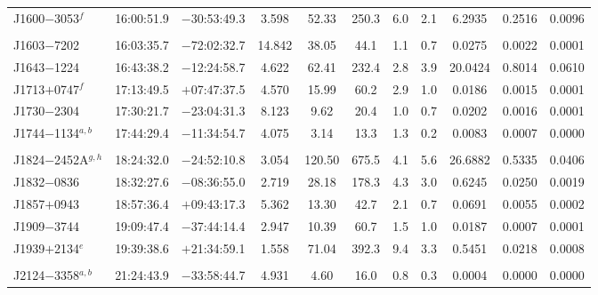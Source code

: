 \documentclass[useAMS,usenatbib]{mn2e}
\begin{document}
\begin{table}
\begin{center}
\begin{tabular}{lcccccccccc}
J1600$-$3053$^{f}$   & 16:00:51.9  &  $-$30:53:49.3 &  3.598  &  52.33    & 250.3    & 6.0       & 2.1    &  6.2935  &  0.2516  &  0.0096  \\ 
                     &             &                &         &           &          &           &        &          &          &          \\ 
J1603$-$7202         & 16:03:35.7  &  $-$72:02:32.7 &  14.842 &  38.05    & 44.1     & 1.1       & 0.7    &  0.0275  &  0.0022  &  0.0001  \\ 
J1643$-$1224         & 16:43:38.2  &  $-$12:24:58.7 &  4.622  &  62.41    & 232.4    & 2.8       & 3.9    &  20.0424 &  0.8014  &  0.0610  \\
J1713$+$0747$^{f}$   & 17:13:49.5  &  $+$07:47:37.5 &  4.570  &  15.99    & 60.2     & 2.9       & 1.0    &  0.0186  &  0.0015  &  0.0001  \\ 
J1730$-$2304         & 17:30:21.7  &  $-$23:04:31.3 &  8.123  &  9.62     & 20.4     & 1.0       & 0.7    &  0.0202  &  0.0016  &  0.0001  \\ 
J1744$-$1134$^{a,b}$ & 17:44:29.4  &  $-$11:34:54.7 &  4.075  &  3.14     & 13.3     & 1.3       & 0.2    &  0.0083  &  0.0007  &  0.0000  \\ 
                     &             &                &         &           &          &           &        &          &          &          \\ 
J1824$-$2452A$^{g,h}$& 18:24:32.0  &  $-$24:52:10.8 &  3.054  &  120.50   & 675.5    & 4.1       & 5.6    & 26.6882  &  0.5335  &  0.0406  \\ 
J1832$-$0836         & 18:32:27.6  &  $-$08:36:55.0 &  2.719  &  28.18    & 178.3    & 4.3       & 3.0    &  0.6245  &  0.0250  &  0.0019  \\ 
J1857$+$0943         & 18:57:36.4  &  $+$09:43:17.3 &  5.362  &  13.30    & 42.7     & 2.1       & 0.7    &  0.0691  &  0.0055  &  0.0002  \\ 
J1909$-$3744         & 19:09:47.4  &  $-$37:44:14.4 &  2.947  &  10.39    & 60.7     & 1.5       & 1.0    &  0.0187  &  0.0007  &  0.0001  \\ 
J1939$+$2134$^{e}$   & 19:39:38.6  &  $+$21:34:59.1 &  1.558  &  71.04    & 392.3    & 9.4       & 3.3    &  0.5451  &  0.0218  &  0.0008  \\ 
                     &             &                &         &           &          &           &        &          &          &          \\ 
J2124$-$3358$^{a,b}$ & 21:24:43.9  &  $-$33:58:44.7 &  4.931  &  4.60     & 16.0     & 0.8       & 0.3    &  0.0004  &  0.0000  &  0.0000  \\ 

\end{tabular}
\end{center}
\end{table}
\end{document}

